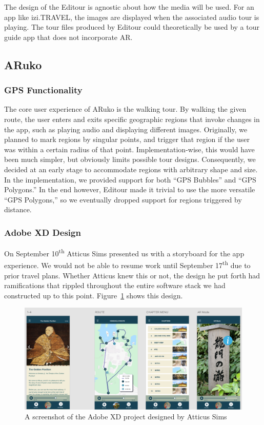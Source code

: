 \documentclass[a4paper, 10pt, american, titlepage]{article}
\begin{document}
The design of the Editour is agnostic about how the media will be used. For an
app like izi.TRAVEL, the images are displayed when the associated audio tour is
playing. The tour files produced by Editour could theoretically be used by a
tour guide app that does not incorporate AR. 

\subsection{ARuko}
\label{sec:aruko}

\subsubsection{GPS Functionality}
\label{sec:gpsFunctionality}
The core user experience of ARuko is the walking tour. By walking the given
route, the user enters and exits specific geographic regions that invoke
changes in the app, such as playing audio and displaying different images.
Originally, we planned to mark regions by singular points, and trigger that
region if the user was within a certain radius of that point.
Implementation-wise, this would have been much simpler, but obviously limits
possible tour designs. Consequently, we decided at an early stage to
accommodate regions with arbitrary shape and size.  In the implementation, we
provided support for both ``GPS Bubbles'' and ``GPS Polygons.'' In the end
however, Editour made it trivial to use the more versatile ``GPS Polygons,'' so
we eventually dropped support for regions triggered by distance.

\subsubsection{Adobe XD Design}
\label{sec:adobeXdDesign}

On September 10\textsuperscript{th} Atticus Sims presented us with a storyboard
for the app experience. We would not be able to resume work until September
17\textsuperscript{th} due to prior travel plans. Whether Atticus knew this or
not, the design he put forth had ramifications that rippled throughout the
entire software stack we had constructed up to this point.
Figure~\ref{fig:adobeXdDesign} shows this design.

\begin{figure}[h]
	\centering
	\includegraphics[width=1\textwidth]{adobe-xd-design.png}
	\caption[A screenshot of the Adobe XD project designed by Atticus Sims]
    {A screenshot of the Adobe XD project designed by Atticus Sims}
	\label{fig:adobeXdDesign}
\end{figure}
\end{document}
